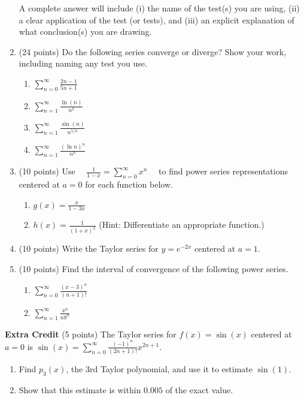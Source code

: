 \documentclass[12pt]{article}
\let\ds\displaystyle
\begin{document}
\begin{enumerate}
A complete answer will include (i) the name of the test(s) you are using, (ii) a clear application of the test (or tests), and (iii) an explicit explanation of what conclusion(s) you are drawing.
		
\newpage
\item (24 points) Do the following series converge or diverge? Show your work, including naming any test you use.
	\begin{enumerate}
	\item $\ds \sum_{n=0}^\infty \frac{2n-1}{5n+1}$
	\vfill
	\item $\ds \sum_{n=1}^\infty \frac{\ln(n)}{n^2} $
	\vfill
	\newpage
	\item $\ds \sum_{n=1}^\infty \frac{\sin(n)}{n^{5/3}}$
	\vfill
	\item $\ds \sum_{n=1}^\infty \frac{(\ln n)^{n}}{n^n} $
	\vfill
	\end{enumerate}
\newpage
\item (10 points) Use $\quad \ds \frac{1}{1-x}=\sum_{n=0}^\infty x^n \quad$ to find power series representations centered at $a=0$ for each function below.  				\begin{enumerate}
	\item $g(x)=\frac{x}{1-3x}$  
	\vspace{3in}
	\item $h(x)=\frac{1}{(1+x)^2}$ (Hint: Differentiate an appropriate function.)
	\vfill
	\end{enumerate}
\newpage
\item (10 points) Write the Taylor series for $y=e^{-2x}$ centered at $a=1.$
\vfill

\item (10 points) Find the interval of convergence of the following power series.
	\begin{enumerate}
	\item $\ds \sum_{n=0}^\infty \frac{(x-3)^{n}}{(n+1)!}$
	\vfill
	\item $\ds \sum_{n=1}^\infty \frac{x^n}{n8^n}$
	\vfill
	\end{enumerate}

\end{enumerate}
\newpage
\textbf{Extra Credit} (5 points) The Taylor series for $f(x)=\sin(x)$ centered at $a=0$ is $\ds \sin(x)=\sum_{n=0}^\infty \frac{(-1)^n}{(2n+1)!}x^{2n+1}.$
\begin{enumerate}
\item Find $p_3(x)$, the 3rd Taylor polynomial, and use it to estimate $\sin(1).$
\item Show that this estimate is within $0.005$ of the exact value.
\end{enumerate}
\vfill
\end{document}
